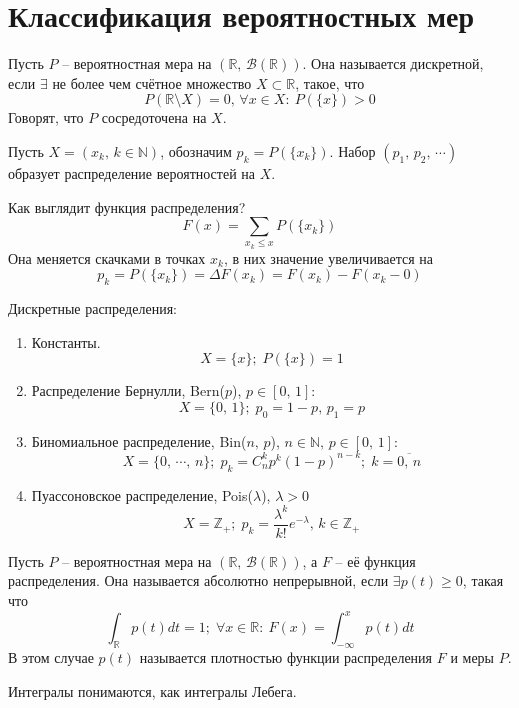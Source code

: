 \section{Классификация вероятностных мер}
\begin{definition}
	Пусть $P$ -- вероятностная мера на $(\mathbb{R},\, \mathcal{B}(\mathbb{R}))$. Она называется дискретной, если $\exists$ не более чем счётное множество $X \subset \mathbb{R}$, такое, что
	\[P(\mathbb{R} \setminus X) = 0,\, \forall x \in X:\: P(\{x\}) > 0\]
	Говорят, что $P$ сосредоточена на $X$.

	Пусть $X = (x_k,\, k \in \mathbb{N})$, обозначим $p_k = P(\{x_k\})$. Набор $(p_1,\,p_2,\,\cdots)$ образует распределение вероятностей на $X$.

	Как выглядит функция распределения?
	\[F(x) = \sum_{x_k \leq x}P(\{x_k\})\]
	Она меняется скачками в точках $x_k$, в них значение увеличивается на
	\[p_k = P(\{x_k\}) = \Delta F(x_k) = F(x_k) - F(x_k - 0)\]
\end{definition}

\begin{example}
	Дискретные распределения:
	\begin{enumerate}
		\item Константы.
		      \[X = \{x\};\; P(\{x\}) = 1\]
		\item Распределение Бернулли, Bern($p$), $p \in [0,\,1]$:
		      \[X = \{0,\, 1\};\; p_0 = 1 - p,\, p_1 = p\]
		\item Биномиальное распределение, Bin($n,\,p$), $n \in \mathbb{N},\, p \in [0,\,1]$:
		      \[X = \{0,\,\cdots,\,n\};\; p_k = C_n^k p^k (1-p)^{n - k};\; k = \overline{0,\,n}\]
		\item Пуассоновское распределение, Pois($\lambda$), $\lambda > 0$
		      \[X = \mathbb{Z}_+;\; p_k = \frac{\lambda^k}{k!}e^{-\lambda},\, k \in \mathbb{Z}_+\]
	\end{enumerate}
\end{example}

\begin{definition}
	Пусть $P$ -- вероятностная мера на $(\mathbb{R},\, \mathcal{B}(\mathbb{R}))$, а $F$ -- её функция распределения. Она называется абсолютно непрерывной, если $\exists p(t) \geq 0$, такая что
	\[\int_\mathbb{R}p(t)dt = 1;\; \forall x \in \mathbb{R} :\: F(x) = \int_{-\infty}^x p(t)dt\]
	В этом случае $p(t)$ называется плотностью функции распределения $F$ и меры $P$.
\end{definition}

\begin{note}
	Интегралы понимаются, как интегралы Лебега.
\end{note}

